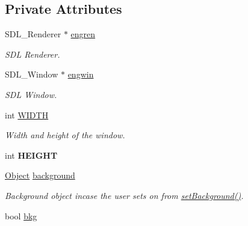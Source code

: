 \subsection*{Private Attributes}
\begin{DoxyCompactItemize}
\item 
S\+D\+L\+\_\+\+Renderer $\ast$ \hyperlink{classEngine_a1e579e93e790357bac1cfffd78b0286e}{engren}\hypertarget{classEngine_a1e579e93e790357bac1cfffd78b0286e}{}\label{classEngine_a1e579e93e790357bac1cfffd78b0286e}

\begin{DoxyCompactList}\small\item\em S\+DL Renderer. \end{DoxyCompactList}\item 
S\+D\+L\+\_\+\+Window $\ast$ \hyperlink{classEngine_a0ea9af2afce867a361cd8deaf9fcec16}{engwin}\hypertarget{classEngine_a0ea9af2afce867a361cd8deaf9fcec16}{}\label{classEngine_a0ea9af2afce867a361cd8deaf9fcec16}

\begin{DoxyCompactList}\small\item\em S\+DL Window. \end{DoxyCompactList}\item 
int \hyperlink{classEngine_a4936cdde2d50255f762466c05d69155d}{W\+I\+D\+TH}\hypertarget{classEngine_a4936cdde2d50255f762466c05d69155d}{}\label{classEngine_a4936cdde2d50255f762466c05d69155d}

\begin{DoxyCompactList}\small\item\em Width and height of the window. \end{DoxyCompactList}\item 
int {\bfseries H\+E\+I\+G\+HT}\hypertarget{classEngine_aeb283222e500da8011acde9683a380ea}{}\label{classEngine_aeb283222e500da8011acde9683a380ea}

\item 
\hyperlink{classObject}{Object} \hyperlink{classEngine_a019b277554748849fcc29d8b57fc3e65}{background}\hypertarget{classEngine_a019b277554748849fcc29d8b57fc3e65}{}\label{classEngine_a019b277554748849fcc29d8b57fc3e65}

\begin{DoxyCompactList}\small\item\em Background object incase the user sets on from \hyperlink{classEngine_a671bd48802debd6c16638de60d32375d}{set\+Background()}. \end{DoxyCompactList}\item 
bool \hyperlink{classEngine_a1392f77c91da64239d2d644acddf21a0}{bkg}\hypertarget{classEngine_a1392f77c91da64239d2d644acddf21a0}{}\label{classEngine_a1392f77c91da64239d2d644acddf21a0}


\end{DoxyCompactItemize}
